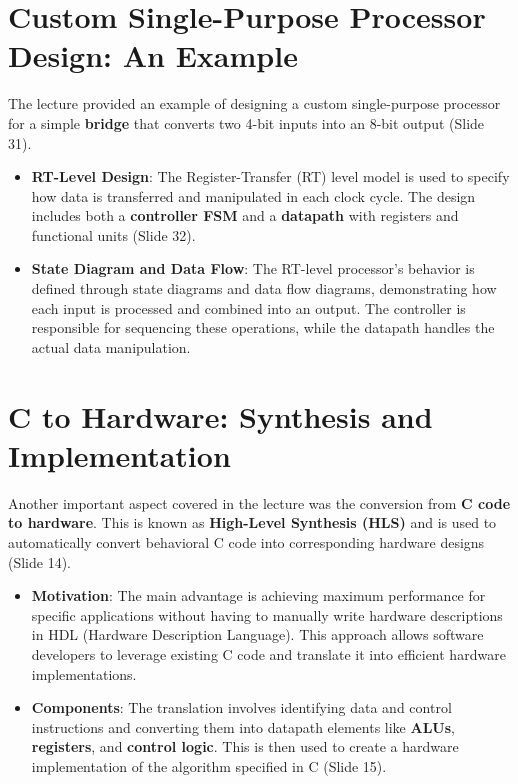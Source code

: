 \documentclass[
  14pt,
  a4paper,
  numbers=noendperiod,
  headinclude=true,
  footinclude=true,
  DIV=calc]{scrreprt}
\begin{document}
\section{Custom Single-Purpose Processor Design: An
Example}\label{custom-single-purpose-processor-design-an-example}

The lecture provided an example of designing a custom single-purpose
processor for a simple \textbf{bridge} that converts two 4-bit inputs
into an 8-bit output (Slide 31).

\begin{itemize}
\item
  \textbf{RT-Level Design}: The Register-Transfer (RT) level model is
  used to specify how data is transferred and manipulated in each clock
  cycle. The design includes both a \textbf{controller FSM} and a
  \textbf{datapath} with registers and functional units (Slide 32).
\item
  \textbf{State Diagram and Data Flow}: The RT-level processor's
  behavior is defined through state diagrams and data flow diagrams,
  demonstrating how each input is processed and combined into an output.
  The controller is responsible for sequencing these operations, while
  the datapath handles the actual data manipulation.
\end{itemize}

\section{C to Hardware: Synthesis and
Implementation}\label{c-to-hardware-synthesis-and-implementation}

Another important aspect covered in the lecture was the conversion from
\textbf{C code to hardware}. This is known as \textbf{High-Level
Synthesis (HLS)} and is used to automatically convert behavioral C code
into corresponding hardware designs (Slide 14).

\begin{itemize}
\item
  \textbf{Motivation}: The main advantage is achieving maximum
  performance for specific applications without having to manually write
  hardware descriptions in HDL (Hardware Description Language). This
  approach allows software developers to leverage existing C code and
  translate it into efficient hardware implementations.
\item
  \textbf{Components}: The translation involves identifying data and
  control instructions and converting them into datapath elements like
  \textbf{ALUs}, \textbf{registers}, and \textbf{control logic}. This is
  then used to create a hardware implementation of the algorithm
  specified in C (Slide 15).
\end{itemize}
\end{document}
